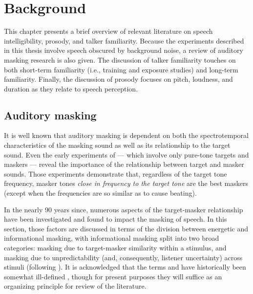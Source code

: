 \chapter{Background}
This chapter presents a brief overview of relevant literature on speech intelligibility, prosody, and talker familiarity.  Because the experiments described in this thesis involve speech obscured by background noise, a review of auditory masking research is also given.  The discussion of talker familiarity touches on both short-term familiarity (i.e., training and exposure studies) and long-term familiarity.  Finally, the discussion of prosody focuses on pitch, loudness, and duration as they relate to speech perception.

\section{Auditory masking}
It is well known that auditory masking is dependent on both the spectrotemporal characteristics of the masking sound as well as its relationship to the target sound.  %
Even the early experiments of \citet{WegelLane1924} — which involve only pure-tone targets and maskers — reveal the importance of the relationship between target and masker sounds.  Those experiments demonstrate that, regardless of the target tone frequency, masker tones \emph{close in frequency to the target tone} are the best maskers (except when the frequencies are so similar as to cause beating).  

In the nearly 90 years since, numerous aspects of the target-masker relationship have been investigated and found to impact the masking of speech.  In this section, those factors are discussed in terms of the division between energetic and informational masking, with informational masking split into two broad categories: masking due to target-masker similarity within a stimulus, and masking due to unpredictability (and, consequently, listener uncertainty) across stimuli (following \citealt{KiddEtAl2002} ).  It is acknowledged that the terms  and  have historically been somewhat ill-defined \citep[cf. discussions in][]{DurlachEtAl2003a, Watson2005}, though for present purposes they will suffice as an organizing principle for review of the literature.%

